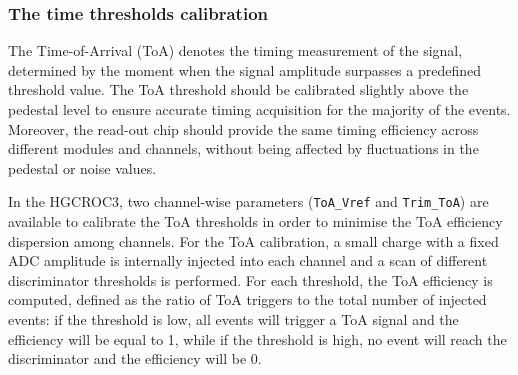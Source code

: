 
\subsubsection{The time thresholds calibration}
\label{subsubsec:The time thresholds calibration}

The Time-of-Arrival (ToA) denotes the timing measurement of the signal, determined by the moment when the signal amplitude surpasses a predefined threshold value. The ToA threshold should be calibrated slightly above the pedestal level to ensure accurate timing acquisition for the majority of the events. Moreover, the read-out chip should provide the same timing efficiency across different modules and channels, without being affected by fluctuations in the pedestal or noise values.

\bigbreak

In the HGCROC3, two channel-wise parameters (\texttt{ToA\_Vref} and \texttt{Trim\_ToA}) are available to calibrate the ToA thresholds in order to minimise the ToA efficiency dispersion among channels.
For the ToA calibration, a small charge with a fixed ADC amplitude is internally injected into each channel and a scan of different discriminator thresholds is performed. For each threshold, the ToA efficiency is computed, defined as the ratio of ToA triggers to the total number of injected events: if the threshold is low, all events will trigger a ToA signal and the efficiency will be equal to 1, while if the threshold is high, no event will reach the discriminator and the efficiency will be 0.

